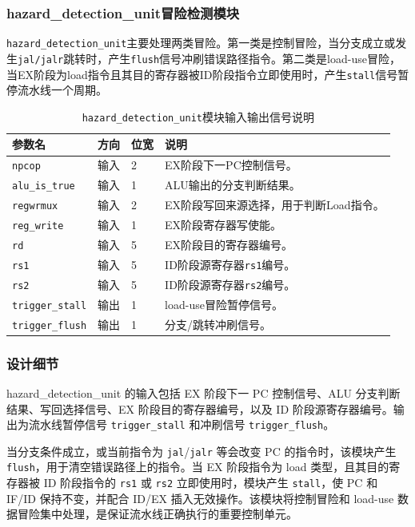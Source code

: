 \documentclass[UTF8,a4paper,12pt]{ctexart}
\newcommand{\code}[1]{\texttt{#1}}
\begin{document}
\subsubsection{hazard\_detection\_unit冒险检测模块}

\code{hazard\_detection\_unit}主要处理两类冒险。第一类是控制冒险，当分支成立或发生\code{jal/jalr}跳转时，产生\code{flush}信号冲刷错误路径指令。第二类是load-use冒险，当EX阶段为load指令且其目的寄存器被ID阶段指令立即使用时，产生\code{stall}信号暂停流水线一个周期。

\begin{table}[H]
\centering
\caption{\code{hazard\_detection\_unit}模块输入输出信号说明}
\footnotesize
\renewcommand{\arraystretch}{1.15}
\begin{tabularx}{\textwidth}{p{3.2cm}p{1.5cm}p{2.1cm}X}
\toprule
参数名 & 方向 & 位宽 & 说明 \\
\midrule
\code{npcop} & 输入 & 2 & EX阶段下一PC控制信号。 \\
\code{alu\_is\_true} & 输入 & 1 & ALU输出的分支判断结果。 \\
\code{regwrmux} & 输入 & 2 & EX阶段写回来源选择，用于判断Load指令。 \\
\code{reg\_write} & 输入 & 1 & EX阶段寄存器写使能。 \\
\code{rd} & 输入 & 5 & EX阶段目的寄存器编号。 \\
\code{rs1} & 输入 & 5 & ID阶段源寄存器\code{rs1}编号。 \\
\code{rs2} & 输入 & 5 & ID阶段源寄存器\code{rs2}编号。 \\
\code{trigger\_stall} & 输出 & 1 & load-use冒险暂停信号。 \\
\code{trigger\_flush} & 输出 & 1 & 分支/跳转冲刷信号。 \\
\bottomrule
\end{tabularx}
\end{table}

\subsubsection*{设计细节}

hazard\_detection\_unit 的输入包括 EX 阶段下一 PC 控制信号、ALU 分支判断结果、写回选择信号、EX 阶段目的寄存器编号，以及 ID 阶段源寄存器编号。输出为流水线暂停信号 \code{trigger\_stall} 和冲刷信号 \code{trigger\_flush}。

当分支条件成立，或当前指令为 \code{jal}/\code{jalr} 等会改变 PC 的指令时，该模块产生 \code{flush}，用于清空错误路径上的指令。当 EX 阶段指令为 load 类型，且其目的寄存器被 ID 阶段指令的 \code{rs1} 或 \code{rs2} 立即使用时，模块产生 \code{stall}，使 PC 和 IF/ID 保持不变，并配合 ID/EX 插入无效操作。该模块将控制冒险和 load-use 数据冒险集中处理，是保证流水线正确执行的重要控制单元。
\end{document}
